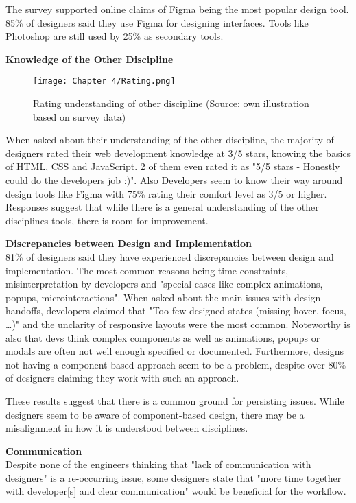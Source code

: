 The survey supported online claims of Figma being the most popular design tool. 85\% of designers
said they use Figma for designing interfaces. Tools like Photoshop are still used by 25\% as
secondary tools.

\textbf{Knowledge of the Other Discipline}\\
\begin{figure}[H]
    \centering
    \texttt{[image: Chapter 4/Rating.png]}
    \caption{Rating understanding of other discipline (Source: own illustration based on survey data)}
\end{figure}
When asked about their understanding of the other discipline, the majority of designers rated their
web development knowledge at 3/5 stars, knowing the basics of HTML, CSS and JavaScript. 2 of
them even rated it as "5/5 stars - Honestly could do the developers job :)". Also Developers seem to
know their way around design tools like Figma with 75\% rating their comfort level as 3/5 or higher.
Responses suggest that while there is a general understanding of the other disciplines tools, there
is room for improvement.

\textbf{Discrepancies between Design and Implementation}\\
81\% of designers said they have experienced discrepancies between design and implementation. The
most common reasons being time constraints, misinterpretation by developers and "special cases like
complex animations, popups, microinteractions". When asked about the main issues with design
handoffs, developers claimed that "Too few designed states (missing hover, focus, \dots)" and
the unclarity of responsive layouts were the most common. Noteworthy is also that devs think complex
components as well as animations, popups or modals are often not well enough specified or
documented. Furthermore, designs not having a component-based approach seem to be a problem, despite
over 80\% of designers claiming they work with such an approach.

These results suggest that there is a common ground for persisting issues. While designers seem to
be aware of component-based design, there may be a misalignment in how it is understood between
disciplines.

\textbf{Communication}\\
Despite none of the engineers thinking that "lack of communication with designers" is a re-occurring
issue, some designers state that "more time together with developer[s] and clear communication"
would be beneficial for the workflow.

